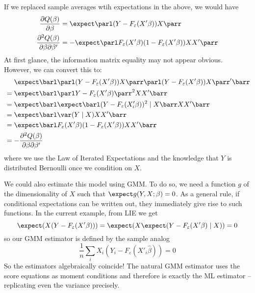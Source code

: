\documentclass[10pt]{article}
\begin{document}
\begin{example}
	\begin{remark}
		If we replaced sample averages wtih expectations in the above, we would have \begin{align*} \frac{\partial Q(\beta)}{\partial \beta} &= \expect\parl (Y - F_\varepsilon(X'\beta)) X\parr \\ \frac{\partial^2 Q(\beta)}{\partial \beta \partial \beta'} &= -\expect \parl F_\varepsilon(X'\beta)(1-F_\varepsilon(X'\beta))XX'\parr \end{align*}At first glance, the information matrix equality may not appear obvious. However, we can convert this to: \begin{align*} &\quad\;\hspace{.02cm} \expect\barl  \parl (Y - F_\varepsilon(X'\beta)) X\parr\parl (Y - F_\varepsilon(X'\beta)) X\parr'\barr \\ &= \expect \barl \parl Y-F_\varepsilon(X'\beta) \parr^2 XX'\barr \\ &= \expect \barl \expect \barl (Y - F_\varepsilon(X_i'\beta))^2 \mid X\barr XX'\barr \\ &= \expect\barl \var(Y\mid X) XX'\barr \\ &= \expect \barl F_\varepsilon(X'\beta)(1-F_\varepsilon(X'\beta))XX'\barr \\ &= - \frac{\partial^2Q(\beta)}{\partial \beta \partial \beta'}\end{align*}where we use the Law of Iterated Expectations and the knowledge that $Y$ is distributed Bernoulli once we condition on $X$.
	\end{remark}
	\begin{remark}
		We could also estimate this model using GMM. To do so, we need a function $g$ of the dimensionality of $X$ such that $\expect g(Y,X;\beta) = 0$. As a general rule, if conditional expectations can be written out, they immediately give rise to such functions. In the current example, from LIE we get \[\expect(X(Y - F_\varepsilon(X'\beta))) = \expect(X\expect(Y -F_\varepsilon(X'\beta)\mid X)) = 0\]so our GMM estimator is defined by the sample analog \[\frac{1}{n}\sum_i X_i(Y_i - F_\varepsilon(X'_i\hat{\beta})) = 0\]So the estimators algebraically coincide! The natural GMM estimator uses the score equations as moment conditions and therefore is exactly the ML estimator -- replicating even the variance precisely.
	\end{remark}
	

\end{example}
\end{document}
